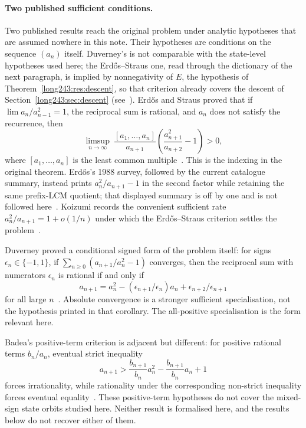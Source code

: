 \documentclass[11pt]{article}
\begin{document}
\paragraph{Two published sufficient conditions.}
Two published results reach the original problem under analytic hypotheses that
are assumed nowhere in this note.  Their hypotheses are conditions on the
sequence $(a_n)$ itself.  Duverney's is not comparable with the state-level
hypotheses used here; the Erd\H{o}s--Straus one, read through the dictionary of
the next paragraph, is implied by nonnegativity of $E$, the hypothesis of
Theorem~\ref{long243:res:descent}, so that criterion already covers the descent of
Section~\ref{long243:sec:descent} (see~\cite[Cor.~4(1) and Prop.~1(1), pp.~14--15]{koizumi2025}).
Erd\H{o}s and Straus proved that if $\lim a_n/a_{n-1}^{2}=1$, the reciprocal
sum is rational, and $a_n$ does not satisfy the recurrence, then
\[
 \limsup_{n\to\infty}\ \frac{[a_1,\ldots,a_n]}{a_{n+1}}
 \left(\frac{a_{n+1}^{2}}{a_{n+2}}-1\right)>0,
\]
where $[a_1,\ldots,a_n]$ is the least common
multiple~\cite[Theorem~3, p.~132]{erdosstraus1964}.  This is the indexing in
the original theorem.  Erd\H{o}s's 1988 survey, followed by the current
catalogue summary, instead prints $a_n^2/a_{n+1}-1$ in the second factor while
retaining the same prefix-LCM quotient; that displayed summary is off by one
and is not followed here~\cite[p.~105]{erdos1988}\cite{erdosproblems}.
Koizumi records the convenient sufficient rate
$a_n^2/a_{n+1}=1+o(1/n)$ under which the Erd\H{o}s--Straus criterion settles
the problem~\cite[Remark~3, p.~16]{koizumi2025}.

Duverney proved a
conditional signed form of the problem itself: for signs
$\epsilon_n\in\{-1,1\}$, if
$\sum_{n\ge0}(a_{n+1}/a_n^{2}-1)$ converges, then the reciprocal sum with
numerators $\epsilon_n$ is rational if and only if
\[
 a_{n+1}=a_n^2-(\epsilon_{n+1}/\epsilon_n)a_n
             +\epsilon_{n+2}/\epsilon_{n+1}
\]
for all large $n$~\cite[Corollary~3.2, p.~287]{duverney2001}.  Absolute
convergence is a stronger sufficient specialisation, not the hypothesis
printed in that corollary.  The all-positive specialisation is the form
relevant here.

Badea's positive-term criterion is adjacent but different:
for positive rational terms $b_n/a_n$, eventual strict inequality
\[
 a_{n+1}>\frac{b_{n+1}}{b_n}a_n^2-\frac{b_{n+1}}{b_n}a_n+1
\]
forces irrationality, while rationality under the corresponding non-strict
inequality forces eventual equality~\cite[Theorem~A, p.~313; Cor.~2.2,
p.~316]{badea1993}.  These positive-term hypotheses do not cover the
mixed-sign state orbits studied here.  Neither result is formalised here, and
the results below do not recover either of them.
\end{document}
